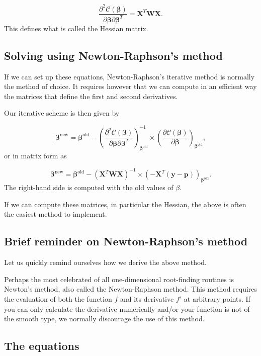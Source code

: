 \documentclass[%
oneside,                 %
final,                   %
10pt]{article}
\begin{document}
\[
\frac{\partial^2 \mathcal{C}(\bm{\beta})}{\partial \bm{\beta}\partial \bm{\beta}^T} = \bm{X}^T\bm{W}\bm{X}. 
\]
This defines what is called  the Hessian matrix.

\subsection*{Solving using Newton-Raphson's method}

If we can set up these equations, Newton-Raphson's iterative method is normally the method of choice. It requires however that we can compute in an efficient way the  matrices that define the first and second derivatives. 

Our iterative scheme is then given by

\[
\bm{\beta}^{\mathrm{new}} = \bm{\beta}^{\mathrm{old}}-\left(\frac{\partial^2 \mathcal{C}(\bm{\beta})}{\partial \bm{\beta}\partial \bm{\beta}^T}\right)^{-1}_{\bm{\beta}^{\mathrm{old}}}\times \left(\frac{\partial \mathcal{C}(\bm{\beta})}{\partial \bm{\beta}}\right)_{\bm{\beta}^{\mathrm{old}}},
\]
or in matrix form as

\[
\bm{\beta}^{\mathrm{new}} = \bm{\beta}^{\mathrm{old}}-\left(\bm{X}^T\bm{W}\bm{X} \right)^{-1}\times \left(-\bm{X}^T(\bm{y}-\bm{p}) \right)_{\bm{\beta}^{\mathrm{old}}}.
\]
The right-hand side is computed with the old values of $\beta$. 

If we can compute these matrices, in particular the Hessian, the above is often the easiest method to implement. 


\subsection*{Brief reminder on Newton-Raphson's method}

Let us quickly remind ourselves how we derive the above method.

Perhaps the most celebrated of all one-dimensional root-finding
routines is Newton's method, also called the Newton-Raphson
method. This method  requires the evaluation of both the
function $f$ and its derivative $f'$ at arbitrary points. 
If you can only calculate the derivative
numerically and/or your function is not of the smooth type, we
normally discourage the use of this method.

\subsection*{The equations}
\end{document}

